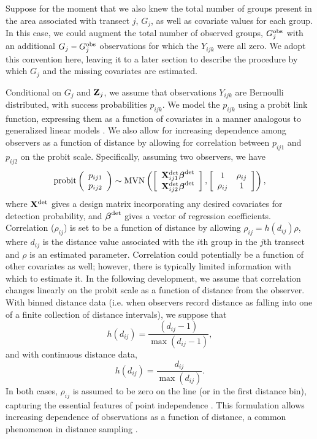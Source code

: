 \documentclass[10pt]{article}
\begin{document}
Suppose for the moment that we also knew the total number of groups present in the area associated with transect $j$, $G_j$, as well as covariate values for each group.  In this case, we could augment the total number of observed groups, $G_j^{\rm obs}$ with an additional $G_j-G_j^{\rm obs}$ observations for which the $Y_{ijk}$ were all zero.  We adopt this convention here, leaving it to a later section to describe the procedure by which $G_j$ and the missing covariates are estimated.

Conditional on $G_j$ and ${\bf Z}_j$, we assume that observations $Y_{ijk}$ are Bernoulli distributed, with success probabilities $p_{ijk}$.
We model the $p_{ijk}$ using a probit link function, expressing them as a function of covariates in a manner analogous to generalized linear models \cite{McCullaghNelder1989}.  We also allow for increasing dependence among observers as a function of distance by allowing for correlation between $p_{ij1}$ and $p_{ij2}$ on the probit scale. Specifically, assuming two observers, we have
$$
{\rm probit} \left(\begin{array}{c}
				p_{ij1} \\
				p_{ij2}
		\end{array}\right) \sim {\rm MVN}
\left( \left[ \begin{array}{c}
				{\bf X}_{ij1}^{\rm det} \boldsymbol{\beta}^{\rm det}\\
				{\bf X}_{ij2}^{\rm det} \boldsymbol{\beta}^{\rm det}
		\end{array}\right],
        \left[ \begin{array}{cc}
            1 & \rho_{ij} \\
            \rho_{ij} & 1
        \end{array} \right]
\right),
$$
where ${\bf X}^{\rm det}$ gives a design matrix incorporating any desired covariates for detection probability, and $\boldsymbol{\beta}^{\rm det}$ gives a vector of regression coefficients.  Correlation ($\rho_{ij}$) is set to be a function of distance by allowing $\rho_{ij} = h(d_{ij}) \rho$, where $d_{ij}$ is the distance value associated with the $i$th group in the $j$th transect and $\rho$ is an estimated parameter. Correlation could potentially be a function of other covariates as well; however, there is typically limited information with which to estimate it. In the following development, we assume that correlation changes linearly on the probit scale as a function of distance from the observer.  With binned distance data (i.e. when observers record distance as falling into one of a finite collection of distance intervals), we suppose that
$$
h(d_{ij})=\frac{(d_{ij}-1)}{\max(d_{ij}-1)},
$$
and with continuous distance data,
$$
h(d_{ij})=\frac{d_{ij}}{\max(d_{ij})}.
$$
In both cases, $\rho_{ij}$ is assumed to be zero on the line (or in the first distance bin), capturing the essential features of point independence \cite{LaakeBorchers2004,BorchersEtAl2006,BucklandEtAl2010}.  This formulation allows increasing dependence of observations as a function of distance, a common phenomenon in distance sampling \cite{LaakeBorchers2004,BorchersEtAl2006,BucklandEtAl2010}.
\end{document}
